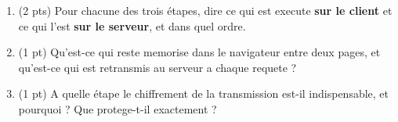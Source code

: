 \begin{enumerate}
  \item (2 pts) Pour chacune des trois étapes, dire ce qui est execute \textbf{sur le client}
  et ce qui l'est \textbf{sur le serveur}, et dans quel ordre.
  \item (1 pt) Qu'est-ce qui reste memorise dans le navigateur entre deux pages, et qu'est-ce
  qui est retransmis au serveur a chaque requete ?
  \item (1 pt) A quelle étape le chiffrement de la transmission est-il indispensable, et
  pourquoi ? Que protege-t-il exactement ?
\end{enumerate}

%
%
%
%
%
